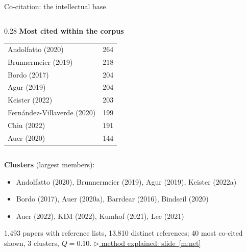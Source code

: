 \documentclass[aspectratio=169,10pt]{beamer}
\newcommand{\method}[1]{\hfill\hyperref[#1]{\tiny\textcolor{c4}{$\triangleright$ method explained: slide~\ref*{#1}}}}
\begin{document}
\begin{frame}{Co-citation: the intellectual base}
\begin{columns}[T]
\begin{column}{0.28\textwidth}\scriptsize
\textbf{Most cited within the corpus}\\[2pt]
\begin{tabular}{@{}lr@{}}Andolfatto (2020) & 264 \\
Brunnermeier (2019) & 218 \\
Bordo (2017) & 204 \\
Agur (2019) & 204 \\
Keister (2022) & 203 \\
Fernández-Villaverde (2020) & 199 \\
Chiu (2022) & 191 \\
Auer (2020) & 144 \\\end{tabular}
\end{column}
\end{columns}
\vspace{2pt}
\scriptsize\textbf{Clusters} (largest members):
\begin{itemize}\setlength\itemsep{0pt}
\item[\textcolor{c1}{$\bullet$}] Andolfatto (2020), Brunnermeier (2019), Agur (2019), Keister (2022a)
\item[\textcolor{c2}{$\bullet$}] Bordo (2017), Auer (2020a), Barrdear (2016), Bindseil (2020)
\item[\textcolor{c3}{$\bullet$}] Auer (2022), KIM (2022), Kumhof (2021), Lee (2021)
\end{itemize}
1,493 papers with reference lists, 13,810 distinct references; 40 most co-cited shown, 3 clusters, $Q=0.10$. \method{m:net}
\end{frame}
\end{document}
